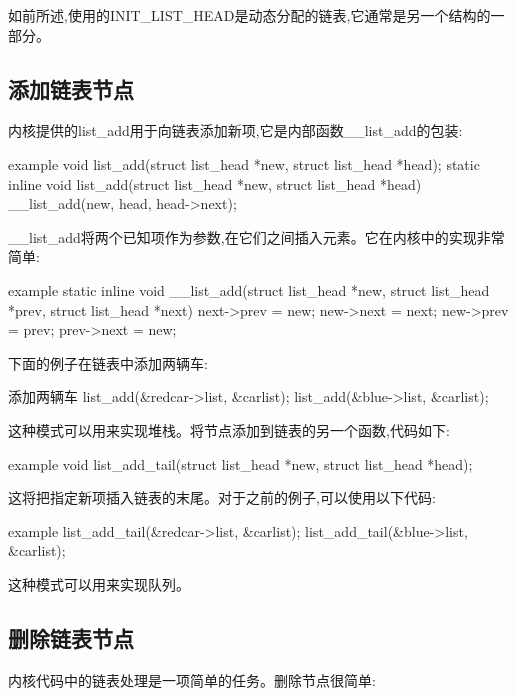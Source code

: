 \documentclass[lang=cn,newtx,10pt,scheme=chinese]{elegantbook}
\begin{document}
如前所述,使用的INIT\_LIST\_HEAD是动态分配的链表,它通常是另一个结构的一部分。

\subsection{添加链表节点}

内核提供的list\_add用于向链表添加新项,它是内部函数\_\_list\_add的包装:

\begin{mycode}{example}
void list_add(struct list_head *new, struct list_head *head);
static inline void list_add(struct list_head *new, struct list_head *head)
{
    __list_add(new, head, head->next);
}
\end{mycode}

\_\_list\_add将两个已知项作为参数,在它们之间插入元素。它在内核中的实现非常简单:

\begin{mycode}{example}
static inline void __list_add(struct list_head *new, struct list_head *prev, struct list_head *next)
{
    next->prev = new;
    new->next = next;
    new->prev = prev;
    prev->next = new;
}
\end{mycode}

下面的例子在链表中添加两辆车:

\begin{mycode}{添加两辆车}
list_add(&redcar->list, &carlist);
list_add(&blue->list, &carlist);
\end{mycode}

这种模式可以用来实现堆栈。将节点添加到链表的另一个函数,代码如下:

\begin{mycode}{example}
void list_add_tail(struct list_head *new, struct list_head *head);
\end{mycode}

这将把指定新项插入链表的末尾。对于之前的例子,可以使用以下代码:

\begin{mycode}{example}
list_add_tail(&redcar->list, &carlist);
list_add_tail(&blue->list, &carlist);
\end{mycode}

这种模式可以用来实现队列。

\subsection{删除链表节点}

内核代码中的链表处理是一项简单的任务。删除节点很简单:
\end{document}
